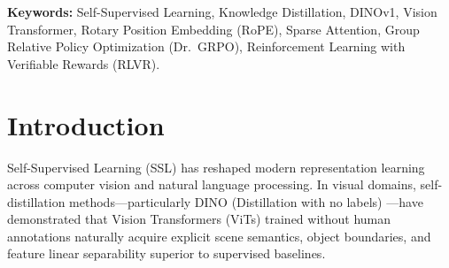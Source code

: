 \documentclass[11pt,a4paper]{article}
\begin{document}
\begin{abstract}
\textbf{+20.10\%} on Vanilla DINOv1 ($58.88\% \to 78.98\%$, CorLoc $79.93\% \to 99.91\%$) and \textbf{+16.99\%} on RoPE+Sparse DINOv1 ($55.45\% \to 72.44\%$, CorLoc $69.26\% \to 98.17\%$), while further improving downstream $k$-NN and Linear Probe accuracy.
\end{abstract}

\textbf{Keywords:} Self-Supervised Learning, Knowledge Distillation, DINOv1, Vision Transformer, Rotary Position Embedding (RoPE), Sparse Attention, Group Relative Policy Optimization (Dr.\ GRPO), Reinforcement Learning with Verifiable Rewards (RLVR).

\section{Introduction}
\label{sec:intro}

Self-Supervised Learning (SSL) has reshaped modern representation learning across computer vision and natural language processing. In visual domains, self-distillation methods—particularly DINO (Distillation with no labels) \cite{caron2021emerging}—have demonstrated that Vision Transformers (ViTs) \cite{dosovitskiy2020image} trained without human annotations naturally acquire explicit scene semantics, object boundaries, and feature linear separability superior to supervised baselines.
\end{document}
